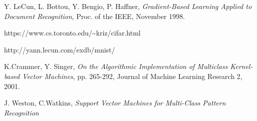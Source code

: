 
\begin{thebibliography}{9}

  Y. LeCun, L. Bottou, Y. Bengio, P. Haffner,
  \emph{Gradient-Based Learning Applied to Document Recognition},
  Proc. of the IEEE,
  November 1998.

  https://www.cs.toronto.edu/{\textasciitilde}kriz/cifar.html

  http://yann.lecun.com/exdb/mnist/

  K.Crammer, Y. Singer,
  \emph{On the Algorithmic Implementation of Multiclass Kernel-based Vector Machines},
  pp. 265-292,
  Journal of Machine Learning Research 2,
  2001.

  J. Weston, C.Watkins,
  \emph{Support Vector Machines for Multi-Class Pattern Recognition}
\end{thebibliography}
